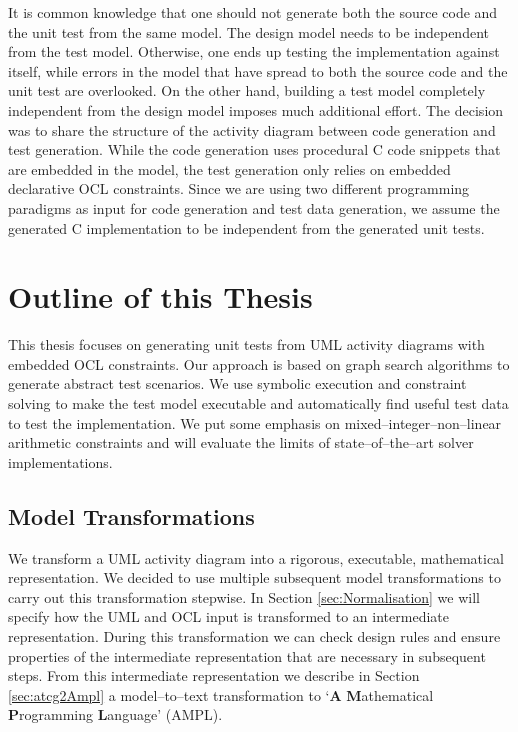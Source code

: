 It is common knowledge that one should not generate both the source code and the unit test from the same model. The design model needs to be independent from the test model. Otherwise, one ends up testing the implementation against itself, while errors in the model that have spread to both the source code and the unit test are overlooked. %
On the other hand, building a test model completely independent from the design model imposes much additional effort. The decision was to share the structure of the activity diagram between code generation and test generation. While the code generation uses procedural C code snippets that are embedded in the model, the test generation only relies on embedded declarative OCL constraints. Since we are using two different programming paradigms as input for code generation and test data generation, we assume the generated C implementation to be independent from the generated unit tests.
\section{Outline of this Thesis}
This thesis focuses on generating unit tests from UML activity diagrams with embedded OCL constraints. Our approach is based on graph search algorithms to generate abstract test scenarios. We use symbolic execution and constraint solving to make the test model executable and automatically find useful test data to test the implementation. We put some emphasis on mixed--integer--non--linear arithmetic constraints and will evaluate the limits of state--of--the--art solver implementations.
\subsection{Model Transformations}
We transform a UML activity diagram into a rigorous, executable, mathematical representation. We decided to use multiple subsequent model transformations to carry out this transformation stepwise. In Section \ref{sec:Normalisation} we will specify how the UML and OCL input is transformed to an intermediate representation. During this transformation we can check design rules and ensure properties of the intermediate representation that are necessary in subsequent steps. From this intermediate representation we describe in Section \ref{sec:atcg2Ampl} a model--to--text transformation to `\textbf{A} \textbf{M}athematical \textbf{P}rogramming \textbf{L}anguage' (AMPL).
